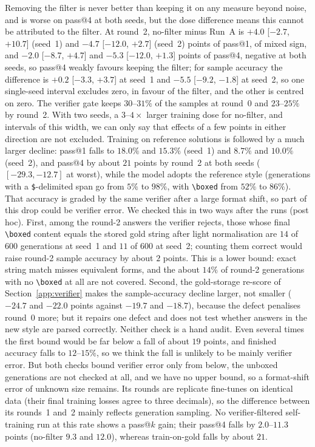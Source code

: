 \documentclass[runningheads]{llncs}
\begin{document}
Removing the filter is never better than keeping it on any measure beyond
noise, and is worse on pass@4 at both seeds, but the dose difference means
this cannot be attributed to the filter. At round~2,
no-filter minus Run~A is $+4.0$ [$-2.7$, $+10.7$] (seed~1) and $-4.7$ [$-12.0$, $+2.7$] (seed~2) points
of pass@1, of mixed sign, and $-2.0$ [$-8.7$, $+4.7$] and $-5.3$ [$-12.0$, $+1.3$] points of pass@4,
negative at both seeds, so pass@4 weakly favours keeping the filter; for sample
accuracy the difference is $+0.2$ [$-3.3$, $+3.7$] at seed~1 and $-5.5$
[$-9.2$, $-1.8$] at seed~2, so one single-seed interval excludes zero, in
favour of the filter, and the other is centred on zero. The verifier
gate keeps $30$--$31\%$ of the samples at round~0 and $23$--$25\%$ by round~2. With two
seeds, a $3$--$4\times$ larger training dose for no-filter, and intervals of this
width, we can only say that effects of a few points in either direction are not
excluded. Training on reference solutions is followed by a much larger decline:
pass@1 falls to $18.0\%$ and $15.3\%$ (seed~1) and $8.7\%$ and $10.0\%$ (seed~2),
and pass@4 by about $21$ points by round~2 at both seeds ($[-29.3,-12.7]$ at
worst), while
the model adopts the reference style (generations with a \texttt{\$}-delimited
span go from $5\%$ to $98\%$, with \verb|\boxed| from $52\%$ to $86\%$). That
accuracy is graded by the same verifier after a large format shift, so part of
this drop could be verifier error. We checked this in two ways after the runs
(post hoc). First, among the round-2 answers the verifier rejects, those whose
final \verb|\boxed| content equals the stored gold string after light
normalisation are $14$ of $600$ generations at seed~1 and $11$ of $600$ at
seed~2; counting them correct would raise round-2 sample accuracy by about $2$
points. This is a lower bound: exact string match misses equivalent forms, and
the about $14\%$ of round-2 generations with no \verb|\boxed| at all are not
covered. Second, the gold-storage re-score of Section~\ref{app:verifier} makes
the sample-accuracy decline larger, not smaller ($-24.7$ and $-22.0$ points
against $-19.7$ and $-18.7$), because the defect penalises round~0 more; but it
repairs one defect and does not test whether answers in the new style are
parsed correctly. Neither check is a hand audit. Even several times the first
bound would be far below a fall of about $19$ points, and finished accuracy
falls to $12$--$15\%$, so we think the fall is unlikely to be mainly verifier
error. But both checks bound verifier error only from below, the unboxed
generations are not checked at all, and we have no upper bound, so a
format-shift error of unknown size remains.
Its rounds are replicate fine-tunes on
identical data (their final training losses agree to three decimals), so the
difference between its rounds~1 and~2 mainly reflects generation sampling. No
verifier-filtered self-training run at this rate shows a pass@$k$ gain; their
pass@4 falls by $2.0$--$11.3$ points (no-filter $9.3$ and $12.0$), whereas
train-on-gold falls by about $21$.
\end{document}
